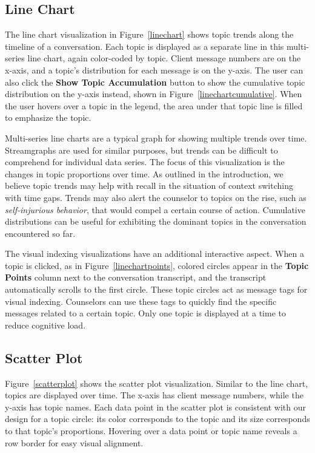 \subsection{Line Chart}

The line chart visualization in Figure~\ref{linechart} shows topic trends along the timeline of a conversation. Each topic is displayed as a separate line in this multi-series line chart, again color-coded by topic. Client message numbers are on the x-axis, and a topic's distribution for each message is on the y-axis. The user can also click the \textbf{Show Topic Accumulation} button to show the cumulative topic distribution on the y-axis instead, shown in Figure~\ref{linechartcumulative}. When the user hovers over a topic in the legend, the area under that topic line is filled to emphasize the topic.

Multi-series line charts are a typical graph for showing multiple trends over time. Streamgraphs are used for similar purposes, but trends can be difficult to comprehend for individual data series. The focus of this visualization is the changes in topic proportions over time. As outlined in the introduction, we believe topic trends may help with recall in the situation of context switching with time gaps. Trends may also alert the counselor to topics on the rise, such as \textit{self-injurious behavior}, that would compel a certain course of action. Cumulative distributions can be useful for exhibiting the dominant topics in the conversation encountered so far.

The visual indexing visualizations have an additional interactive aspect. When a topic is clicked, as in Figure~\ref{linechartpoints}, colored circles appear in the \textbf{Topic Points} column next to the conversation transcript, and the transcript automatically scrolls to the first circle. These topic circles act as message tags for visual indexing. Counselors can use these tags to quickly find the specific messages related to a certain topic. Only one topic is displayed at a time to reduce cognitive load.

\subsection{Scatter Plot}

Figure~\ref{scatterplot} shows the scatter plot visualization. Similar to the line chart, topics are displayed over time. The x-axis has client message numbers, while the y-axis has topic names. Each data point in the scatter plot is consistent with our design for a topic circle: its color corresponds to the topic and its size corresponds to that topic's proportions. Hovering over a data point or topic name reveals a row border for easy visual alignment.

